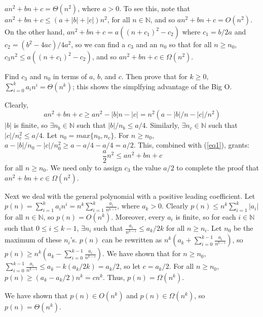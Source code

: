 \documentclass{article}
\newenvironment{prb}[1]
	{\renewcommand\theinner{#1}\inner}
	{\endinner}
\newcommand{\N}{\mathbb{N}}
\begin{document}
$an^2+bn+c=\Theta(n^2)$, where $a>0$. To see this, note that 
$an^2+bn+c\leq(a+|b|+|c|)n^2$, for all $n\in\N$, and so 
$an^2+bn+c=O(n^2)$. On the other hand, 
$an^2+bn+c=a((n+c_1)^2-c_2)$ where $c_1=b/2a$ and 
$c_2=(b^2-4ac)/4a^2$, so we can find a $c_3$ and an $n_0$ so that
for all $n\geq n_0$, $c_3n^2\leq a((n+c_1)^2-c_2)$, and so
$an^2+bn+c\in\Omega(n^2)$.

\begin{prb}{1.2}
Find $c_3$ and $n_0$ in terms of $a$, $b$, and $c$. Then prove that
for $k\geq0$, $\sum_{i=0}^ka_in^i=\Theta(n^k)$; this shows the 
simplfying advantage of the Big O.
\end{prb}

\break
Clearly, 
\begin{equation}\label{eq1}
an^2+bn+c\ge an^2-|b|n-|c|=n^2(a-|b|/n-|c|/n^2)
\end{equation} 
$|b|$ is finite, so $\exists n_b\in\N$ such that $|b|/n_b\le a/4$.
Similarly, $\exists n_c\in\N$ such that $|c|/n_c^2\le a/4$.
Let $n_0=max\{n_b,n_c\}$. For $n\ge n_0$, 
$a-|b|/n_0-|c|/n_0^2\ge a-a/4-a/4=a/2$. This, combined with (\ref{eq1}),
grants:
\begin{equation}\label{eq2}
\frac{a}{2}n^2\leq an^2+bn+c
\end{equation}
for all $n\ge n_0$. We need only to assign $c_3$ the value $a/2$ to complete
the proof that $an^2+bn+c\in\Omega(n^2)$.

Next we deal with the general polynomial with a positive leading coefficient.
Let $p(n)=\sum_{i=1}^ka_in^i=n^k\sum_{i=1}^k\frac{a_i}{n^{k-i}}$, 
where $a_k>0$. Clearly $p(n)\leq n^k\sum_{i=1}^k|a_i|$ for all $n\in\N$,
so $p(n)=O(n^k)$. Moreover, every $a_i$ is finite, so for each $i\in\N$
such that $0\le i\le k-1$, $\exists n_i$ such that 
$\frac{a_i}{n^{k-i}}\le a_k/2k$ for all $n\ge n_i$. Let $n_0$ be the maximum of
these $n_i$'s. $p(n)$ can be rewritten as 
$n^k(a_k+\sum_{i=0}^{k-1}\frac{a_i}{n^{k-i}})$, so 
$p(n)\ge n^k(a_k-\sum_{i=0}^{k-1}\frac{a_i}{n^{k-i}})$.
We have shown that for $n\ge n_0$, 
$\sum_{i=0}^{k-1}\frac{a_i}{n^{k-i}}\le a_k-k(a_k/2k)=a_k/2$, so let $c=a_k/2$.
For all $n\ge n_0$, $p(n)\ge(a_k-a_k/2)n^k=cn^k$. Thus, $p(n)=\Omega(n^k)$.

We have shown that $p(n)\in O(n^k)$ and $p(n)\in\Omega(n^k)$, so 
$p(n)=\Theta(n^k)$. 
\end{document}
